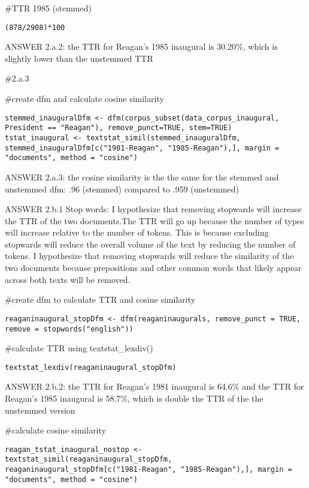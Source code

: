 \documentclass[
]{article}
\begin{document}
\#TTR 1985 (stemmed)

\begin{verbatim}
(878/2908)*100
\end{verbatim}

ANSWER 2.a.2: the TTR for Reagan's 1985 inaugural is 30.20\%, which is
slightly lower than the unstemmed TTR

\#2.a.3

\#create dfm and calculate cosine similarity

\begin{verbatim}
stemmed_inauguralDfm <- dfm(corpus_subset(data_corpus_inaugural, President == "Reagan"), remove_punct=TRUE, stem=TRUE)
tstat_inaugural <- textstat_simil(stemmed_inauguralDfm, stemmed_inauguralDfm[c("1981-Reagan", "1985-Reagan"),], margin = "documents", method = "cosine")
\end{verbatim}

ANSWER 2.a.3: the cosine similarity is the the same for the stemmed and
unstemmed dfm: .96 (stemmed) compared to .959 (unstemmed)

ANSWER 2.b.1 Stop words: I hypothesize that removing stopwards will
increase the TTR of the two documents.The TTR will go up because the
number of types will increase relative to the number of tokens. This is
because excluding stopwards will reduce the overall volume of the text
by reducing the number of tokens. I hypothesize that removing stopwards
will reduce the similarity of the two documents because prepositions and
other common words that likely appear across both texts will be removed.

\#create dfm to calculate TTR and cosine similarity

\begin{verbatim}
reaganinaugural_stopDfm <- dfm(reaganinaugurals, remove_punct = TRUE, remove = stopwords("english"))
\end{verbatim}

\#calculate TTR using textstat\_lexdiv()

\begin{verbatim}
textstat_lexdiv(reaganinaugural_stopDfm)
\end{verbatim}

ANSWER 2.b.2: the TTR for Reagan's 1981 inaugural is 64.6\% and the TTR
for Reagan's 1985 inaugural is 58.7\%, which is double the TTR of the
the unstemmed version

\#calculate cosine similarity

\begin{verbatim}
reagan_tstat_inaugural_nostop <- textstat_simil(reaganinaugural_stopDfm, reaganinaugural_stopDfm[c("1981-Reagan", "1985-Reagan"),], margin = "documents", method = "cosine")
\end{verbatim}
\end{document}
